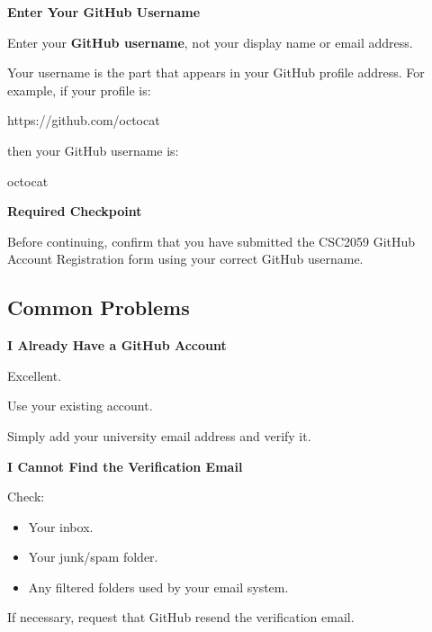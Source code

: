 \documentclass{csc2059practical}
\begin{document}
\begin{importantnote}
\textbf{Enter Your GitHub Username}\par
\medskip

Enter your \textbf{GitHub username}, not your display name or email address.

Your username is the part that appears in your GitHub profile address. For example, if your profile is:

\begin{terminalplain}
https://github.com/octocat
\end{terminalplain}

then your GitHub username is:

\begin{terminalplain}
octocat
\end{terminalplain}
\end{importantnote}

\begin{reflectionbox}
\textbf{Required Checkpoint}\par
\medskip

Before continuing, confirm that you have submitted the CSC2059 GitHub Account Registration form using your correct GitHub username.
\end{reflectionbox}

\subsection{Common Problems}
\begin{commonerror}
\textbf{I Already Have a GitHub Account}\par
\medskip
Excellent.

Use your existing account.

Simply add your university email address and verify it.
\end{commonerror}
\begin{commonerror}
\textbf{I Cannot Find the Verification Email}\par
\medskip
Check:

\begin{itemize}
  \item Your inbox.
  \item Your junk/spam folder.
  \item Any filtered folders used by your email system.
\end{itemize}
If necessary, request that GitHub resend the verification email.
\end{commonerror}
\end{document}
